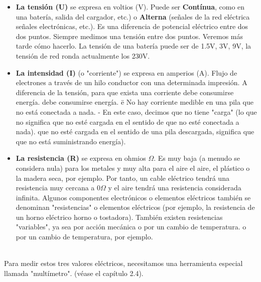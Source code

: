 \documentclass[a5paper,twoside,openany]{book}
\begin{document}
\begin{itemize}
\item \textbf{La tensión (U)} se expresa en voltios (V). Puede ser \textbf{Contínua}, como en una batería, salida del cargador, etc.) o \textbf{Alterna} (señales de la red eléctrica
señales electrónicas, etc.). Es una diferencia de potencial eléctrico entre dos
dos puntos. Siempre medimos una tensión entre dos puntos. Veremos más tarde cómo hacerlo. La tensión de una batería puede ser de 1.5V, 3V, 9V, la tensión de red ronda actualmente los 230V.

\item \textbf{La intensidad (I)} (o "corriente") se expresa en amperios (A).
Flujo de electrones a través de un hilo conductor con una determinada impresión.
A diferencia de la tensión, para que exista una corriente debe consumirse energía.
debe consumirse energía. ë
No hay corriente medible en una pila que no está conectada a nada.
- En este caso, decimos que no tiene "carga" (lo que no significa que no esté cargada en el sentido de que no esté conectada a nada).
 que no esté cargada en el sentido de una pila descargada, significa que
que no está suministrando energía).

\item \textbf{La resistencia (R)} se expresa en ohmios $\Omega$. Es muy baja
(a menudo se considera nula) para los metales y muy alta para el aire
el aire, el plástico o la madera seca, por ejemplo.
Por tanto, un cable eléctrico tendrá una resistencia muy cercana a 0$\Omega$ y el aire tendrá
una resistencia considerada infinita.
Algunos componentes electrónicos o elementos eléctricos también se denominan "resistencias"
o elementos eléctricos (por ejemplo, la resistencia de un horno eléctrico
horno o tostadora).
También existen resistencias "variables", ya sea por acción mecánica o por un cambio de temperatura.
o por un cambio de temperatura, por ejemplo.

\end{itemize}

\noindent{}\\

Para medir estos tres valores eléctricos, necesitamos una herramienta especial llamada "multímetro". (véase el capítulo 2.4).
\end{document}
